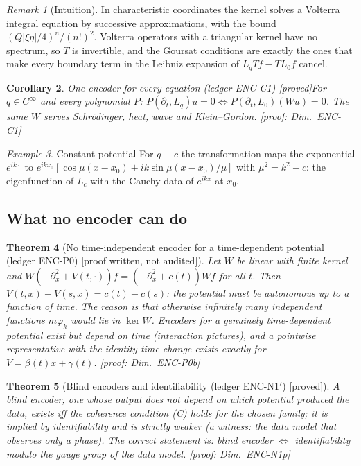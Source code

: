 \documentclass[11pt]{article}
\theoremstyle{plain}
\newtheorem{theorem}{Theorem}[section]
\newtheorem{corollary}[theorem]{Corollary}
\theoremstyle{definition}
\theoremstyle{remark}
\newtheorem{remark}[theorem]{Remark}
\newtheorem{example}[theorem]{Example}
\newcommand{\badge}[2]{\textcolor{#1}{\textsf{\footnotesize[#2]}}}
\newcommand{\proved}[1][]{\badge{cC}{proved#1}}
\newcommand{\led}[1]{\textcolor{cG}{\textsf{\footnotesize(ledger #1)}}}
\newenvironment{intuition}{\begin{remark}[Intuition]}{\end{remark}}
\newcommand{\dimref}[1]{\textsf{\footnotesize[proof: Dim.~#1]}}
\newcommand{\pw}{\badge{cD}{proof written, not audited}}
\begin{document}
\begin{intuition}
In characteristic coordinates the kernel solves a Volterra integral equation by successive approximations, with the bound $(Q|\xi\eta|/4)^n/(n!)^2$. Volterra operators with a triangular kernel have no spectrum, so $T$ is invertible, and the Goursat conditions are exactly the ones that make every boundary term in the Leibniz expansion of $L_qTf-TL_0f$ cancel.
\end{intuition}

\begin{corollary}{One encoder for every equation \led{ENC-C1} \proved}\label{cor:encc1}
For $q\in C^\infty$ and every polynomial $P$: $P(\partial_t,L_q)u=0\iff P(\partial_t,L_0)(Wu)=0$. The same $W$ serves Schr\"odinger, heat, wave and Klein--Gordon.
\dimref{ENC-C1}
\end{corollary}

\begin{example}{Constant potential}
For $q\equiv c$ the transformation maps the exponential $e^{ik\cdot}$ to $e^{ikx_0}[\cos\mu(x-x_0)+ik\sin\mu(x-x_0)/\mu]$ with $\mu^2=k^2-c$: the eigenfunction of $L_c$ with the Cauchy data of $e^{ikx}$ at $x_0$.
\end{example}

\subsection{What no encoder can do}

\begin{theorem}[{No time-independent encoder for a time-dependent potential \led{ENC-P0} \pw}]\label{thm:encp0}
Let $W$ be linear with finite kernel and $W(-\partial_x^2+V(t,\cdot))f=(-\partial_x^2+c(t))Wf$ for all $t$. Then $V(t,x)-V(s,x)=c(t)-c(s)$: the potential must be autonomous up to a function of time. The reason is that otherwise infinitely many independent functions $m\varphi_k$ would lie in $\ker W$. Encoders for a genuinely time-dependent potential exist but depend on time (interaction pictures), and a pointwise representative with the identity time change exists exactly for $V=\beta(t)x+\gamma(t)$.
\dimref{ENC-P0b}
\end{theorem}

\begin{theorem}[{Blind encoders and identifiability \led{ENC-N1$'$} \proved}]\label{lem:encn1}
A blind encoder, one whose output does not depend on which potential produced the data, exists iff the coherence condition (C) holds for the chosen family; it is implied by identifiability and is strictly weaker (a witness: the data model that observes only a phase). The correct statement is: blind encoder $\iff$ identifiability modulo the gauge group of the data model.
\dimref{ENC-N1p}
\end{theorem}
\end{document}
